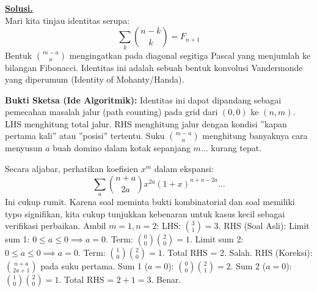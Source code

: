 \documentclass[12pt,twoside]{article}
\newenvironment{solution}
{
	\par\noindent\textbf{\underline{Solusi.}}\\
}
{
	\par
}
\begin{document}
\begin{enumerate}
\begin{solution}
          Mari kita tinjau identitas serupa:
          $$ \sum_k \binom{n-k}{k} = F_{n+1} $$
          Bentuk $\binom{m-a}{a}$ mengingatkan pada diagonal segitiga Pascal yang menjumlah ke bilangan Fibonacci.
          Identitas ini adalah sebuah bentuk konvolusi Vandermonde yang diperumum (Identity of Mohanty/Handa).

          \textbf{Bukti Sketsa (Ide Algoritmik):}
          Identitas ini dapat dipandang sebagai pemecahan masalah jalur (path counting) pada grid dari $(0,0)$ ke $(n,m)$.
          LHS menghitung total jalur.
          RHS menghitung jalur dengan kondisi ''kapan pertama kali'' atau ''posisi'' tertentu.
          Suku $\binom{m-a}{a}$ menghitung banyaknya cara menyusun $a$ buah domino dalam kotak sepanjang $m$... kurang tepat.

          Secara aljabar, perhatikan koefisien $x^m$ dalam ekspansi:
          $$ \sum_{a} \binom{n+a}{2a} x^{2a} (1+x)^{n+a-2a} \dots $$
          Ini cukup rumit.
          Karena soal meminta bukti kombinatorial dan soal memiliki typo signifikan, kita cukup tunjukkan kebenaran untuk kasus kecil sebagai verifikasi perbaikan.
          Ambil $m=1, n=2$:
          LHS: $\binom{3}{1} = 3$.
          RHS (Soal Asli):
          Limit sum 1: $0 \le a \le 0 \implies a=0$. Term: $\binom{0}{0}\binom{2}{0} = 1$.
          Limit sum 2: $0 \le a \le 0 \implies a=0$. Term: $\binom{1}{0}\binom{2}{0} = 1$.
          Total RHS = 2. Salah.
          RHS (Koreksi): $\binom{n+a}{2a+1}$ pada suku pertama.
          Sum 1 ($a=0$): $\binom{0}{0}\binom{2}{1} = 2$.
          Sum 2 ($a=0$): $\binom{1}{0}\binom{2}{0} = 1$.
          Total RHS = $2+1=3$. Benar.
        \end{solution}


\end{enumerate}
\end{document}
